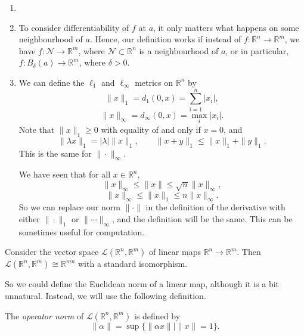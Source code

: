 \documentclass[12pt]{article}
\begin{document}
\begin{remark}
	\begin{enumerate}[1.]
		\item[]
		\item To consider differentiability of $f$ at $a$, it only matters what happens on some neighbourhood of $a$. Hence, our definition works if instead of $f : \mathbb{R}^{n} \to \mathbb{R}^{m}$, we have $f : \mathcal{N} \to \mathbb{R}^{m}$, where $\mathcal{N} \subset \mathbb{R}^{n}$ is a neighbourhood of $a$, or in particular, $f : B_{\delta}(a) \to \mathbb{R}^{m}$, where $\delta > 0$.
		\item We can define the $\ell_1$ and $\ell_{\infty}$ metrics on $\mathbb{R}^{n}$ by
			\[
			\|x\|_{1} = d_1(0, x) = \sum_{i = 1}^{n} |x_i|,
			\]
			\[
			\|x\|_{\infty} = d_{\infty}(0, x) = \max_{i}|x_i|
			.\]
			Note that $\|x\|_1 \geq 0$ with equality of and only if $x = 0$, and
			\[
			\|\lambda x\|_1 = |\lambda| \|x\|_1, \qquad \|x + y\|_1 \leq \|x\|_1 + \|y\|_1
			.\]
			This is the same for $\|\cdot\|_{\infty}$.

			We have seen that for all $x \in \mathbb{R}^{n}$,
			\[
			\|x\|_{\infty} \leq \|x\| \leq \sqrt n \|x\|_{\infty},
			\]
			\[
			\|x\|_{\infty} \leq \|x\|_{1} \leq n \|x\|_{\infty}
			.\]
			So we can replace our norm $\|\cdot\|$ in the definition of the derivative with either $\|\cdot\|_{1}$ or $\|\cdots\|_{\infty}$, and the definition will be the same. This can be sometimes useful for computation.
	\end{enumerate}
\end{remark}

Consider the vector space $\mathcal{L}(\mathbb{R}^{n}, \mathbb{R}^{m})$ of linear maps $\mathbb{R}^{n} \to \mathbb{R}^{m}$. Then $\mathcal{L}(\mathbb{R}^{n}, \mathbb{R}^{m}) \cong \mathbb{R}^{mn}$ with a standard isomorphism.

So we could define the Euclidean norm of a linear map, although it is a bit unnatural. Instead, we will use the following definition.

\begin{definition}
	The \textit{operator norm} of $\mathcal{L}(\mathbb{R}^{n}, \mathbb{R}^{m})$ is defined by
	\[
		\|\alpha\| = \sup \{ \|\alpha x\| \mid \|x\| = 1 \}
	.\]
\end{definition}
\end{document}
